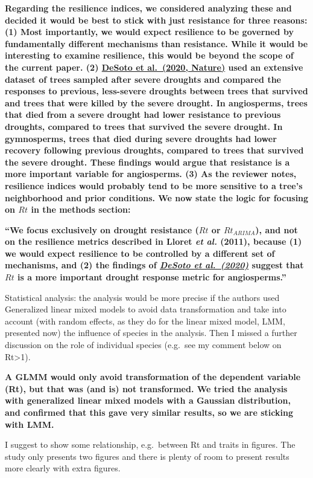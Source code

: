 \documentclass[
]{article}
\begin{document}
\textbf{Regarding the resilience indices, we considered analyzing these
and decided it would be best to stick with just resistance for three
reasons: (1) Most importantly, we would expect resilience to be governed
by fundamentally different mechanisms than resistance. While it would be
interesting to examine resilience, this would be beyond the scope of the
current paper. (2)
\href{https://www.nature.com/articles/s41467-020-14300-5}{DeSoto et
al.~(2020, Nature)} used an extensive dataset of trees sampled after
severe droughts and compared the responses to previous, less-severe
droughts between trees that survived and trees that were killed by the
severe drought. In angiosperms, trees that died from a severe drought
had lower resistance to previous droughts, compared to trees that
survived the severe drought. In gymnosperms, trees that died during
severe droughts had lower recovery following previous droughts, compared
to trees that survived the severe drought. These findings would argue
that resistance is a more important variable for angiosperms. (3) As the
reviewer notes, resilience indices would probably tend to be more
sensitive to a tree's neighborhood and prior conditions. We now state
the logic for focusing on \(Rt\) in the methods section:}

\textbf{``We focus exclusively on drought resistance (\(Rt\) or
\(Rt_{ARIMA}\)), and not on the resilience metrics described in Lloret
\emph{et al.} (2011), because (1) we would expect resilience to be
controlled by a different set of mechanisms, and (2) the findings of
\emph{\href{https://www.nature.com/articles/s41467-020-14300-5}{DeSoto
et al.~(2020)}} suggest that \(Rt\) is a more important drought response
metric for angiosperms.''}

Statistical analysis: the analysis would be more precise if the authors
used Generalized linear mixed models to avoid data transformation and
take into account (with random effects, as they do for the linear mixed
model, LMM, presented now) the influence of species in the analysis.
Then I missed a further discussion on the role of individual species
(e.g.~see my comment below on Rt\textgreater1).

\textbf{A GLMM would only avoid transformation of the dependent variable
(Rt), but that was (and is) not transformed. We tried the analysis with
generalized linear mixed models with a Gaussian distribution, and
confirmed that this gave very similar results, so we are sticking with
LMM.}

I suggest to show some relationship, e.g.~between Rt and traits in
figures. The study only presents two figures and there is plenty of room
to present results more clearly with extra figures.
\end{document}
